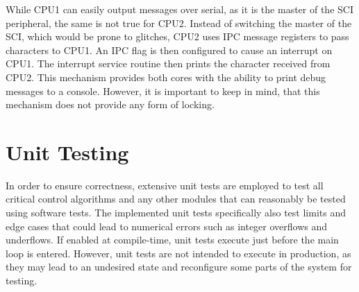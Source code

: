 While CPU1 can easily output messages over serial, as it is the master of the SCI peripheral, the same is not true for CPU2. Instead of switching the master of the SCI, which would be prone to glitches, CPU2 uses IPC message registers to pass characters to CPU1. An IPC flag is then configured to cause an interrupt on CPU1. The interrupt service routine then prints the character received from CPU2. This mechanism provides both cores with the ability to print debug messages to a console. However, it is important to keep in mind, that this mechanism does not provide any form of locking.

\section{Unit Testing}

In order to ensure correctness, extensive unit tests are employed to test all critical control algorithms and any other modules that can reasonably be tested using software tests. The implemented unit tests specifically also test limits and edge cases that could lead to numerical errors such as integer overflows and underflows. If enabled at compile-time, unit tests execute just before the main loop is entered. However, unit tests are not intended to execute in production, as they may lead to an undesired state and reconfigure some parts of the system for testing.
